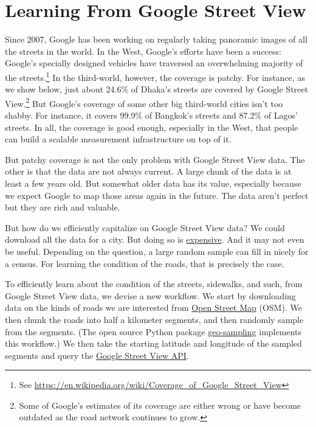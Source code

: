 \documentclass[12pt, letterpaper]{article}
\begin{document}
\section*{Learning From Google Street View}

Since 2007, Google has been working on regularly taking panoramic images of all the streets in the world. In the West, Google's efforts have been a success: Google's specially designed vehicles have traversed an overwhelming majority of the streets.\footnote{See \href{https://en.wikipedia.org/wiki/Coverage\_of\_Google\_Street\_View}{https://en.wikipedia.org/wiki/Coverage\_of\_Google\_Street\_View}} In the third-world, however, the coverage is patchy. For instance, as we show below, just about 24.6\% of Dhaka's streets are covered by Google Street View.\footnote{Some of Google's estimates of its coverage are either wrong or have become outdated as the road network continues to grow.} But Google's coverage of some other big third-world cities isn't too shabby. For instance, it covers 99.9\% of Bangkok's streets and 87.2\% of Lagos' streets. In all, the coverage is good enough, especially in the West, that people can build a scalable measurement infrastructure on top of it.

But patchy coverage is not the only problem with Google Street View data. The other is that the data are not always current. A large chunk of the data is at least a few years old. But somewhat older data has its value, especially because we expect Google to map those areas again in the future. The data aren't perfect but they are rich and valuable. 

But how do we efficiently capitalize on Google Street View data? We could download all the data for a city. But doing so is \href{https://developers.google.com/maps/documentation/streetview/usage-and-billing}{expensive}. And it may not even be useful. Depending on the question, a large random sample can fill in nicely for a census. For learning the condition of the roads, that is precisely the case.

To efficiently learn about the condition of the streets, sidewalks, and such, from Google Street View data, we devise a new workflow. We start by downloading data on the kinds of roads we are interested from \href{https://www.openstreetmap.org}{Open Street Map} (OSM). We then chunk the roads into half a kilometer segments, and then randomly sample from the segments. (The open source Python package \href{https://github.com/geosensing/geo_sampling}{geo-sampling} \citep{laoha2017} implements this workflow.) We then take the starting latitude and longitude of the sampled segments and query the \href{https://developers.google.com/maps/documentation/streetview/intro}{Google Street View API}.
\end{document}
